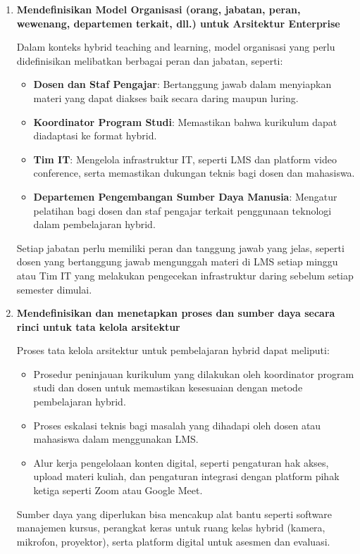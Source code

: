 \begin{enumerate}
	\item \textbf{Mendefinisikan Model Organisasi (orang, jabatan, peran, wewenang, departemen terkait, dll.) untuk Arsitektur Enterprise}
	
	Dalam konteks hybrid teaching and learning, model organisasi yang perlu didefinisikan melibatkan berbagai peran dan jabatan, seperti:
	\begin{itemize}
		\item \textbf{Dosen dan Staf Pengajar}: Bertanggung jawab dalam menyiapkan materi yang dapat diakses baik secara daring maupun luring.
		\item \textbf{Koordinator Program Studi}: Memastikan bahwa kurikulum dapat diadaptasi ke format hybrid.
		\item \textbf{Tim IT}: Mengelola infrastruktur IT, seperti LMS dan platform video conference, serta memastikan dukungan teknis bagi dosen dan mahasiswa.
		\item \textbf{Departemen Pengembangan Sumber Daya Manusia}: Mengatur pelatihan bagi dosen dan staf pengajar terkait penggunaan teknologi dalam pembelajaran hybrid.
	\end{itemize}
	
	Setiap jabatan perlu memiliki peran dan tanggung jawab yang jelas, seperti dosen yang bertanggung jawab mengunggah materi di LMS setiap minggu atau Tim IT yang melakukan pengecekan infrastruktur daring sebelum setiap semester dimulai.
	
	\item \textbf{Mendefinisikan dan menetapkan proses dan sumber daya secara rinci untuk tata kelola arsitektur}
	
	Proses tata kelola arsitektur untuk pembelajaran hybrid dapat meliputi:
	\begin{itemize}
		\item Prosedur peninjauan kurikulum yang dilakukan oleh koordinator program studi dan dosen untuk memastikan kesesuaian dengan metode pembelajaran hybrid.
		\item Proses eskalasi teknis bagi masalah yang dihadapi oleh dosen atau mahasiswa dalam menggunakan LMS.
		\item Alur kerja pengelolaan konten digital, seperti pengaturan hak akses, upload materi kuliah, dan pengaturan integrasi dengan platform pihak ketiga seperti Zoom atau Google Meet.
	\end{itemize}
	
	Sumber daya yang diperlukan bisa mencakup alat bantu seperti software manajemen kursus, perangkat keras untuk ruang kelas hybrid (kamera, mikrofon, proyektor), serta platform digital untuk asesmen dan evaluasi.
	

\end{enumerate}

